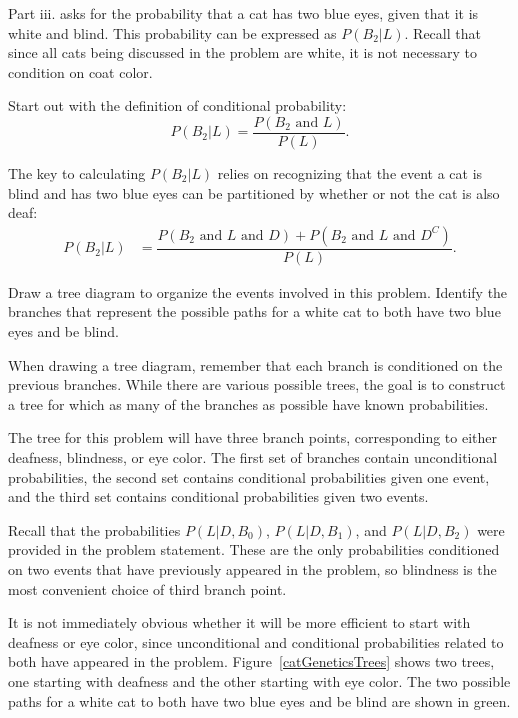 Part iii. asks for the probability that a cat has two blue eyes, given that it is white and blind. This probability can be expressed as $P(B_2|L)$. Recall that since all cats being discussed in the problem are white, it is not necessary to condition on coat color.

Start out with the definition of conditional probability:
\[P(B_2|L) = \dfrac{P(B_2 \textrm{ and } L)}{P(L)}. \]

The key to calculating $P(B_2|L)$ relies on recognizing that the event a cat is blind and has two blue eyes can be partitioned by whether or not the cat is also deaf:
\begin{align}
P(B_2|L) &= \dfrac{P(B_2 \textrm{ and } L \textrm{ and } D) + P(B_2 \textrm{ and } L \textrm{ and } D^C)}{P(L)}.
\label{pB2GivenL}
\end{align}

\begin{examplewrap}
\begin{nexample}{Draw a tree diagram to organize the events involved in this problem. Identify the branches that represent the possible paths for a white cat to both have two blue eyes and be blind. }

When drawing a tree diagram, remember that each branch is conditioned on the previous branches. While there are various possible trees, the goal is to construct a tree for which as many of the branches as possible have known probabilities. 

The tree for this problem will have three branch points, corresponding to either deafness, blindness, or eye color. The first set of branches contain unconditional probabilities, the second set contains conditional probabilities given one event, and the third set contains conditional probabilities given two events.

Recall that the probabilities $P(L|D, B_0)$, $P(L|D, B_1)$, and $P(L|D, B_2)$ were provided in the problem statement. These are the only probabilities conditioned on two events that have previously appeared in the problem, so blindness is the most convenient choice of third branch point. 

It is not immediately obvious whether it will be more efficient to start with deafness or eye color, since unconditional and conditional probabilities related to both have appeared in the problem. Figure~\ref{catGeneticsTrees} shows two trees, one starting with deafness and the other starting with eye color. The two possible paths for a white cat to both have two blue eyes and be blind are shown in green.
\end{nexample}
\end{examplewrap}

